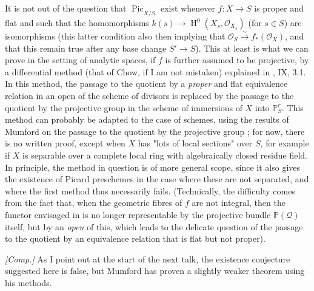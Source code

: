 \begin{remark}\label{fga3.v-5-remarks-5.2}
    It is not out of the question that $\underline{\operatorname{Pic}}_{X/S}$ exist whenever $f\colon X\to S$ is proper and flat and such that the homomorphisms $k(s)\to\operatorname{H}^0(X_s,\mathcal{O}_{X_s})$ (for $s\in S$) are isomorphisms (this latter condition also then implying that $\mathcal{O}_S\xrightarrow{\sim} f_*(\mathcal{O}_X)$, and that this remain true after any base change $S'\to S$).
    This at least is what we can prove in the setting of analytic spaces, if $f$ is further assumed to be projective, by a differential method (that of Chow, if I am not mistaken) explained in \cite{Gro1960a}, IX, 3.1.
    In this method, the passage to the quotient by a \emph{proper} and flat equivalence relation in an open of the scheme of divisors is replaced by the passage to the quotient by the projective group in the scheme of immersions of $X$ into $\mathbb{P}_S^r$.
    This method can probably be adapted to the case of schemes, using the results of Mumford on the passage to the quotient by the projective group \cite{Mum1961};
    for now, there is no written proof, except when $X$ has "lots of local sections" over $S$, for example if $X$ is separable over a complete local ring with algebraically closed residue field.
    In principle, the method in question is of more general scope, since it also gives the existence of Picard preschemes in the case where these are not separated, and where the first method thus necessarily fails.
    (Technically, the difficulty comes from the fact that, when the geometric fibres of $f$ are not integral, then the functor envisaged in  is no longer representable by the projective bundle $\mathbb{P}(\mathcal{Q})$ itself, but by an \emph{open} of this, which leads to the delicate question of the passage to the quotient by an equivalence relation that is flat but not proper).


    \emph{[Comp.]}
    As I point out at the start of the next talk, the existence conjecture suggested here is false, but Mumford has proven a slightly weaker theorem using his methods.
\end{remark}

